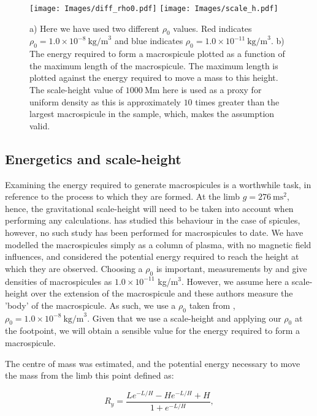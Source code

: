 \begin{figure}[h!]
	\centering
	\texttt{[image: Images/diff\_rho0.pdf]}
	\texttt{[image: Images/scale\_h.pdf]}
	\caption{\small a) Here we have used two different $\rho_0$ values. Red indicates $\rho_0 = 1.0 \times 10^{-8}\ \textrm{kg/m}^{3}$ and blue indicates $\rho_0 = 1.0 \times 10^{-11}\ \textrm{kg/m}^{3}$. b) The energy required to form a macrospicule plotted as a function of the maximum length of the macrospicule. The maximum length is plotted against the energy required to move a mass to this height. The scale-height value of $1000\ \textrm{Mm}$ here is used as a proxy for uniform density as this is approximately $10$ times greater than the largest macrospicule in the sample, which, makes the assumption valid.}
	\label{fig:scale_h}
\end{figure}

\subsection{Energetics and scale-height}
Examining the energy required to generate macrospicules is a worthwhile task, in reference to the process to which they are formed. At the limb $g = 276\ \textrm{ms}^2$, hence, the gravitational scale-height will need to be taken into account when performing any calculations. \citealt{Pereira2012} has studied this behaviour in the case of spicules, however, no such study has been performed for macrospicules to date. We have modelled the macrospicules simply as a column of plasma, with no magnetic field influences, and considered the potential energy required to reach the height at which they are observed. Choosing a $\rho_0$ is important, measurements by \citealt{Parenti2002} and \citealt{Withbroe1976} give densities of macrospicules as $1.0 \times 10^{-11}$ kg/m$^{3}$. However, we assume here a scale-height over the extension of the macrospicule and these authors measure the 'body' of the macrospicule. As such, we use a $\rho_0$ taken from \citealt{Vernazza1981}, $\rho_0 = 1.0 \times 10^{-8}\ \textrm{kg/m}^{3}$. Given that we use a scale-height and applying our $\rho_0$ at the footpoint, we will obtain a sensible value for the energy required to form a macrospicule.

The centre of mass was estimated, and the potential energy necessary to move the mass from the limb this point defined as:

\begin{equation}
R_y = \frac{Le^{-L/H} - He^{-L/H} + H}{1 + e^{-L/H}},
\end{equation} 

